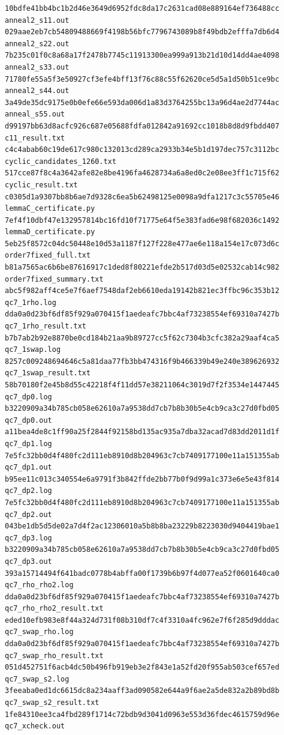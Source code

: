 \documentclass[11pt]{amsart}
\theoremstyle{plain}
\theoremstyle{definition}
\theoremstyle{remark}
\begin{document}
{\fontsize{6.3}{6.9}\selectfont
\begin{verbatim}
10bdfe41bb4bc1b2d46e3649d6952fdc8da17c2631cad08e889164ef736488cc  anneal2_s11.out
029aae2eb7cb54809488669f4198b56bfc7796743089b8f49bdb2efffa7db6d4  anneal2_s22.out
7b235c01f0c8a68a17f2478b7745c11913300ea999a913b21d10d14dd4ae4098  anneal2_s33.out
71780fe55a5f3e50927cf3efe4bff13f76c88c55f62620ce5d5a1d50b51ce9bc  anneal2_s44.out
3a49de35dc9175e0b0efe66e593da006d1a83d3764255bc13a96d4ae2d7744ac  anneal_s55.out
d99197bb63d8acfc926c687e05688fdfa012842a91692cc1018b8d8d9fbdd407  c11_result.txt
c4c4abab60c19de617c980c132013cd289ca2933b34e5b1d197dec757c3112bc  cyclic_candidates_1260.txt
517cce87f8c4a3642afe82e8be4196fa4628734a6a8ed0c2e08ee3ff1c715f62  cyclic_result.txt
c0305d1a9307bb8b6ae7d9328c6ea5b62498125e0098a9dfa1217c3c55705e46  lemmaC_certificate.py
7ef4f10dbf47e132957814bc16fd10f71775e64f5e383fad6e98f682036c1492  lemmaD_certificate.py
5eb25f8572c04dc50448e10d53a1187f127f228e477ae6e118a154e17c073d6c  order7fixed_full.txt
b81a7565ac6b6be87616917c1ded8f80221efde2b517d03d5e02532cab14c982  order7fixed_summary.txt
abc5f982aff4ce5e7f6aef7548daf2eb6610eda19142b821ec3ffbc96c353b12  qc7_1rho.log
dda0a0d23bf6df85f929a070415f1aedeafc7bbc4af73238554ef69310a7427b  qc7_1rho_result.txt
b7b7ab2b92e8870be0cd184b21aa9b89727cc5f62c7304b3cfc382a29aaf4ca5  qc7_1swap.log
8257c009248694646c5a81daa77fb3bb474316f9b466339b49e240e389626932  qc7_1swap_result.txt
58b70180f2e45b8d55c42218f4f11dd57e38211064c3019d7f2f3534e1447445  qc7_dp0.log
b3220909a34b785cb058e62610a7a9538dd7cb7b8b30b5e4cb9ca3c27d0fbd05  qc7_dp0.out
a11bea4de8c1ff90a25f2844f92158bd135ac935a7dba32acad7d83dd2011d1f  qc7_dp1.log
7e5fc32bb0d4f480fc2d111eb8910d8b204963c7cb7409177100e11a151355ab  qc7_dp1.out
b95ee11c013c340554e6a9791f3b842ffde2bb77b0f9d99a1c373e6e5e43f814  qc7_dp2.log
7e5fc32bb0d4f480fc2d111eb8910d8b204963c7cb7409177100e11a151355ab  qc7_dp2.out
043be1db5d5de02a7d4f2ac12306010a5b8b8ba23229b8223030d9404419bae1  qc7_dp3.log
b3220909a34b785cb058e62610a7a9538dd7cb7b8b30b5e4cb9ca3c27d0fbd05  qc7_dp3.out
393a15714494f641badc0778b4abffa00f1739b6b97f4d077ea52f0601640ca0  qc7_rho_rho2.log
dda0a0d23bf6df85f929a070415f1aedeafc7bbc4af73238554ef69310a7427b  qc7_rho_rho2_result.txt
eded10efb983e8f44a324d731f08b310df7c4f3310a4fc962e7f6f285d9dddac  qc7_swap_rho.log
dda0a0d23bf6df85f929a070415f1aedeafc7bbc4af73238554ef69310a7427b  qc7_swap_rho_result.txt
051d452751f6acb4dc50b496fb919eb3e2f843e1a52fd20f955ab503cef657ed  qc7_swap_s2.log
3feeaba0ed1dc6615dc8a234aaff3ad090582e644a9f6ae2a5de832a2b89bd8b  qc7_swap_s2_result.txt
1fe84310ee3ca4fbd289f1714c72bdb9d3041d0963e553d36fdec4615759d96e  qc7_xcheck.out

\end{verbatim}}
\end{document}
